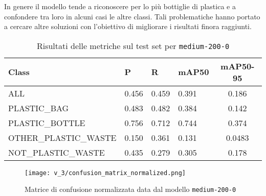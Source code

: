 In genere il modello tende a riconoscere per lo più bottiglie di plastica e a confondere tra loro
in alcuni casi le altre classi. Tali problematiche hanno portato a cercare altre soluzioni con
l'obiettivo di migliorare i risultati finora raggiunti.

    \begin{table}[!htb]
        \centering
        \begin{tabularx}{\textwidth}{lYYYc}
            \toprule
            Class & P & R & mAP50 & mAP50-95 \\
            \midrule
            ALL & 0.456 & 0.459 & 0.391 & 0.186 \\
            PLASTIC\_BAG & 0.483 & 0.482 & 0.384 & 0.142 \\
            PLASTIC\_BOTTLE & 0.756 & 0.712 & 0.744 & 0.374 \\
            OTHER\_PLASTIC\_WASTE & 0.150 & 0.361 & 0.131 & 0.0483 \\
            NOT\_PLASTIC\_WASTE & 0.435 & 0.279 & 0.305 & 0.178 \\
            \bottomrule
        \end{tabularx}
        \caption{Risultati delle metriche sul test set per \texttt{medium-200-0}}
        \label{table:v3-1}
    \end{table}

    \begin{figure}[!htb]
        \centering
        \texttt{[image: v\_3/confusion\_matrix\_normalized.png]}
        \caption{Matrice di confusione normalizzata data dal modello \texttt{medium-200-0}}
        \label{fig:v3-4}
    \end{figure}

